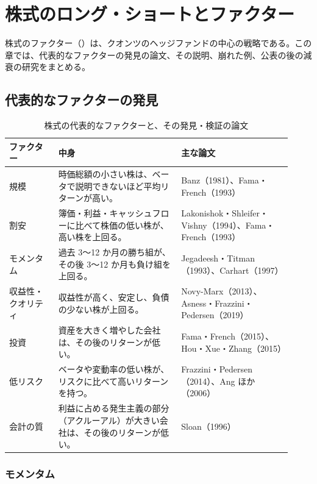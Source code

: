\chapter{株式のロング・ショートとファクター}
\label{ch:equityfactor}

株式のファクター（）は、クオンツのヘッジファンドの中心の戦略である。この章では、代表的なファクターの発見の論文、その説明、崩れた例、公表の後の減衰の研究をまとめる。

\section{代表的なファクターの発見}

\begin{table}[H]
\centering\small
\caption{株式の代表的なファクターと、その発見・検証の論文}
\label{tab:factorpapers}
\begin{tabular}{@{}P{0.16\linewidth}P{0.4\linewidth}P{0.36\linewidth}@{}}
\toprule
ファクター & 中身 & 主な論文 \\
\midrule
規模 & 時価総額の小さい株は、ベータで説明できないほど平均リターンが高い。 & Banz（1981）\cite{banz1981}、Fama・French（1993）\cite{ff1993} \\
割安 & 簿価・利益・キャッシュフローに比べて株価の低い株が、高い株を上回る。 & Lakonishok・Shleifer・Vishny（1994）\cite{lsv1994}、Fama・French（1993） \\
モメンタム & 過去 3〜12 か月の勝ち組が、その後 3〜12 か月も負け組を上回る。 & Jegadeesh・Titman（1993）\cite{jt1993}、Carhart（1997）\cite{carhart1997} \\
収益性・クオリティ & 収益性が高く、安定し、負債の少ない株が上回る。 & Novy-Marx（2013）\cite{novymarx2013}、Asness・Frazzini・Pedersen（2019）\cite{qmj2019} \\
投資 & 資産を大きく増やした会社は、その後のリターンが低い。 & Fama・French（2015）\cite{ff2015}、Hou・Xue・Zhang（2015）\cite{hxz2015} \\
低リスク & ベータや変動率の低い株が、リスクに比べて高いリターンを持つ。 & Frazzini・Pedersen（2014）\cite{bab2014}、Ang ほか（2006）\cite{ahxz2006} \\
会計の質 & 利益に占める発生主義の部分（アクルーアル）が大きい会社は、その後のリターンが低い。 & Sloan（1996）\cite{sloan1996} \\
\bottomrule
\end{tabular}
\end{table}

\subsection{モメンタム}

